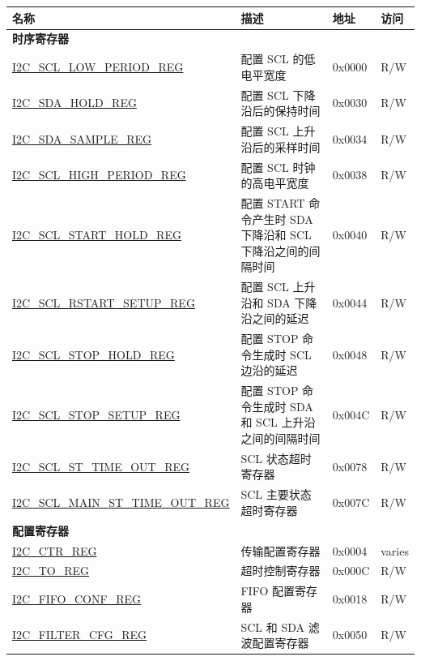 \begin{longtable}{  | m{5.7cm} | m{7cm} | m{1.3cm} | m{1.5cm} | }
\hline\rowcolor{lightgray}
名称 & 描述 &  地址 & 访问 \\ \hline
\endhead
\multicolumn{4}{|l|}{\textbf{时序寄存器}} \\ \hline
\hyperref[regdesc:I2CSCLLOWPERIODREG]{I2C\_SCL\_LOW\_PERIOD\_REG} & 配置 SCL 的低电平宽度 & 0x0000 & R/W \\ \hline
\hyperref[regdesc:I2CSDAHOLDREG]{I2C\_SDA\_HOLD\_REG} & 配置 SCL 下降沿后的保持时间 & 0x0030 & R/W \\ \hline
\hyperref[regdesc:I2CSDASAMPLEREG]{I2C\_SDA\_SAMPLE\_REG} & 配置 SCL 上升沿后的采样时间 & 0x0034 & R/W \\ \hline
\hyperref[regdesc:I2CSCLHIGHPERIODREG]{I2C\_SCL\_HIGH\_PERIOD\_REG} & 配置 SCL 时钟的高电平宽度 & 0x0038 & R/W \\ \hline
\hyperref[regdesc:I2CSCLSTARTHOLDREG]{I2C\_SCL\_START\_HOLD\_REG} & 配置 START 命令产生时 SDA 下降沿和 SCL 下降沿之间的间隔时间 & 0x0040 & R/W \\ \hline
\hyperref[regdesc:I2CSCLRSTARTSETUPREG]{I2C\_SCL\_RSTART\_SETUP\_REG} & 配置 SCL 上升沿和 SDA 下降沿之间的延迟 & 0x0044 & R/W \\ \hline
\hyperref[regdesc:I2CSCLSTOPHOLDREG]{I2C\_SCL\_STOP\_HOLD\_REG} & 配置 STOP 命令生成时 SCL 边沿的延迟 & 0x0048 & R/W \\ \hline
\hyperref[regdesc:I2CSCLSTOPSETUPREG]{I2C\_SCL\_STOP\_SETUP\_REG} & 配置 STOP 命令生成时 SDA 和 SCL 上升沿之间的间隔时间 & 0x004C & R/W \\ \hline
\hyperref[regdesc:I2CSCLSTTIMEOUTREG]{I2C\_SCL\_ST\_TIME\_OUT\_REG} & SCL 状态超时寄存器 & 0x0078 & R/W \\ \hline
\hyperref[regdesc:I2CSCLMAINSTTIMEOUTREG]{I2C\_SCL\_MAIN\_ST\_TIME\_OUT\_REG} & SCL 主要状态超时寄存器 & 0x007C & R/W \\ \hline
\multicolumn{4}{|l|}{\textbf{配置寄存器}} \\ \hline
\hyperref[regdesc:I2CCTRREG]{I2C\_CTR\_REG} & 传输配置寄存器 & 0x0004 & varies \\ \hline
\hyperref[regdesc:I2CTOREG]{I2C\_TO\_REG} & 超时控制寄存器 & 0x000C & R/W \\ \hline
\hyperref[regdesc:I2CFIFOCONFREG]{I2C\_FIFO\_CONF\_REG} & FIFO 配置寄存器 & 0x0018 & R/W \\ \hline
\hyperref[regdesc:I2CFILTERCFGREG]{I2C\_FILTER\_CFG\_REG} & SCL 和 SDA 滤波配置寄存器 & 0x0050 & R/W \\ \hline

\end{longtable}
